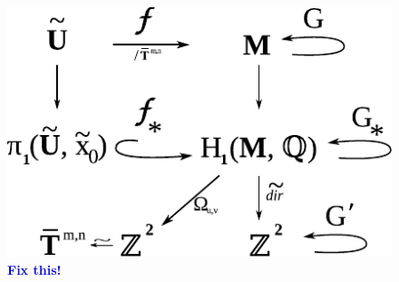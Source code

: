 \documentclass[]{article}
\newcommand{\compav}[1]{\textbf{\textcolor{blue}{#1}}}
\begin{document}
\begin{figure}[H]
\centering


\end{figure}

\begin{figure}[H]
\centering
\includegraphics{z2cover.pdf}
\caption{\compav{Fix this!}}
\end{figure}
\end{document}
